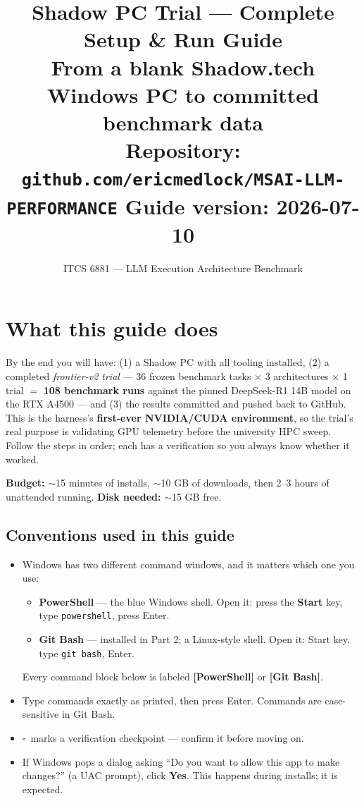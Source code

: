 \documentclass[11pt]{article}
\title{Shadow PC Trial --- Complete Setup \& Run Guide\\
\large From a blank Shadow.tech Windows PC to committed benchmark data\\
\normalsize Repository: \texttt{github.com/ericmedlock/MSAI-LLM-PERFORMANCE} \quad Guide version: 2026-07-10}
\author{ITCS 6881 --- LLM Execution Architecture Benchmark}
\date{}
\newcommand{\checkbox}{$\square$~}
\begin{document}
\maketitle
\thispagestyle{fancy}

\section*{What this guide does}

By the end you will have: (1) a Shadow PC with all tooling installed, (2) a
completed \emph{frontier-v2 trial} --- 36 frozen benchmark tasks $\times$ 3
architectures $\times$ 1 trial $=$ \textbf{108 benchmark runs} against the pinned
DeepSeek-R1 14B model on the RTX A4500 --- and (3) the results committed and pushed
back to GitHub. This is the harness's \textbf{first-ever NVIDIA/CUDA environment},
so the trial's real purpose is validating GPU telemetry before the university HPC
sweep. Follow the steps in order; each has a verification so you always know
whether it worked.

\textbf{Budget:} $\sim$15 minutes of installs, $\sim$10 GB of downloads,
then 2--3 hours of unattended running. \textbf{Disk needed:} $\sim$15 GB free.

\subsection*{Conventions used in this guide}

\begin{itemize}
  \item Windows has two different command windows, and it matters which one you use:
    \begin{itemize}
      \item \textbf{PowerShell} --- the blue Windows shell. Open it: press the
        \textbf{Start} key, type \texttt{powershell}, press Enter.
      \item \textbf{Git Bash} --- installed in Part 2; a Linux-style shell. Open it:
        Start key, type \texttt{git bash}, Enter.
    \end{itemize}
    Every command block below is labeled \textbf{[PowerShell]} or \textbf{[Git Bash]}.
  \item Type commands exactly as printed, then press Enter. Commands are case-sensitive
    in Git Bash.
  \item \checkbox marks a verification checkpoint --- confirm it before moving on.
  \item If Windows pops a dialog asking ``Do you want to allow this app to make
    changes?'' (a UAC prompt), click \textbf{Yes}. This happens during installs; it is expected.
\end{itemize}
\end{document}
